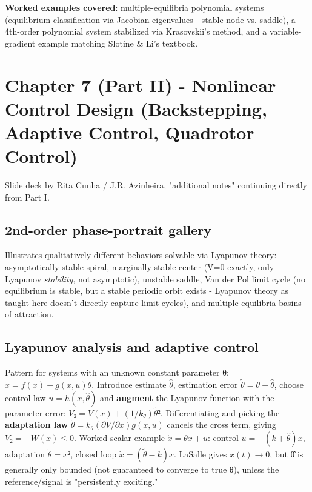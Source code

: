 \documentclass[11pt]{article}
\begin{document}
\textbf{Worked examples covered}: multiple-equilibria polynomial systems (equilibrium classification via Jacobian eigenvalues - stable node vs. saddle), a 4th-order polynomial system stabilized via Krasovskii's method, and a variable-gradient example matching Slotine \& Li's textbook.

\section{Chapter 7 (Part II) - Nonlinear Control Design (Backstepping, Adaptive Control, Quadrotor Control)}

Slide deck by Rita Cunha / J.R. Azinheira, "additional notes" continuing directly from Part I.

\subsection{2nd-order phase-portrait gallery}
Illustrates qualitatively different behaviors solvable via Lyapunov theory: asymptotically stable spiral, marginally stable center (V̇=0 exactly, only Lyapunov \textit{stability}, not asymptotic), unstable saddle, Van der Pol limit cycle (no equilibrium is stable, but a stable periodic orbit exists - Lyapunov theory as taught here doesn't directly capture limit cycles), and multiple-equilibria basins of attraction.

\subsection{Lyapunov analysis and adaptive control}
Pattern for systems with an unknown constant parameter θ: $\dot{x} = f(x) + g(x,u)θ$. Introduce estimate $\hat{θ}$, estimation error $\tilde{θ} = θ-\hat{θ}$, choose control law $u=h(x,\hat{θ})$ and \textbf{augment} the Lyapunov function with the parameter error: $V₂ = V(x) + (1/k_θ)\tilde{θ}²$. Differentiating and picking the \textbf{adaptation law} $\dot{θ\hat{}} = k_θ (∂V/∂x) g(x,u)$ cancels the cross term, giving $\dot{V}₂ = -W(x) ≤ 0$. Worked scalar example $\dot{x}=θx+u$: control $u=-(k+\hat{θ})x$, adaptation $\dot{θ\hat{}}=x²$, closed loop $\dot{x}=(\tilde{θ}-k)x$. LaSalle gives $x(t)→0$, but θ̂ is generally only bounded (not guaranteed to converge to true θ), unless the reference/signal is "persistently exciting."
\end{document}
